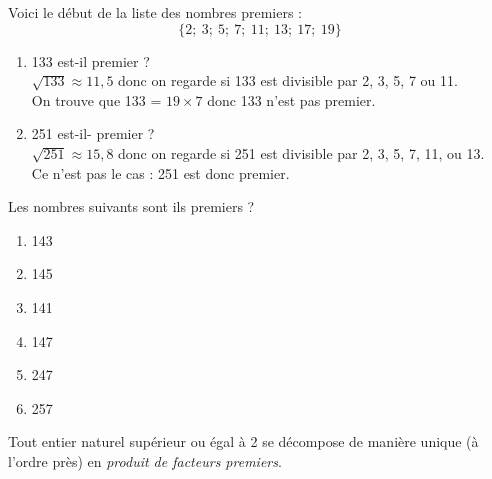 \documentclass[a4paper,12pt,french]{book}
\begin{document}
\begin{methode}
	Voici le début de la liste des nombres premiers :
	$$\lbrace 2;\ 3;\ 5;\ 7;\ 11;\ 13;\ 17;\ 19\rbrace$$
	\begin{enumerate}[\textbullet]
		\item 	133 est-il premier ?\\
		
				$\sqrt{133}\approx 11,5$ donc on regarde si 133 est divisible par 2, 3, 5, 7 ou 11.\\
				On trouve que 133 = $19\times 7$ donc 133 n'est pas premier.
		\item 	251 est-il- premier ?\\
				$\sqrt{251}\approx 15,8$ donc on regarde si 251 est divisible par 2, 3, 5, 7, 11, ou 13.\\
				Ce n'est pas le cas : 251 est donc premier.
	\end{enumerate}
\end{methode}

\begin{exercice}[]
	
	
	Les nombres suivants sont ils premiers ?
	
	\begin{multicols}{3}
		\begin{enumerate}[\bfseries a.]
			\item 143
			\item 145
			\item 141
			\item 147
			\item 247
			\item 257
		\end{enumerate}
	\end{multicols}
	
\end{exercice}


\begin{propriete}
	Tout entier naturel supérieur ou égal à 2 se décompose de manière unique (à l'ordre près) en \textit{produit de facteurs premiers}.
\end{propriete}
\end{document}
